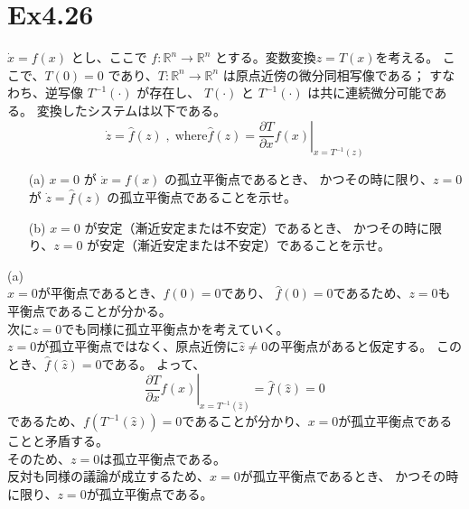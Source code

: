 \documentclass{jsarticle}
\begin{document}
\newpage
\section*{Ex4.26}

$\dot x = f ( x )$ とし、ここで $f \colon \mathbb R^n \rightarrow \mathbb R^n$
とする。変数変換$z = T(x)$を考える。
ここで、$T ( 0 ) = 0$ であり、$T \colon \mathbb R^n → \mathbb R^n$ 
は原点近傍の微分同相写像である；
すなわち、逆写像 $T^{ - 1} ( \cdot)$ が存在し、
$T ( \cdot )$ と $T ^{- 1} ( \cdot )$ 
は共に連続微分可能である。
変換したシステムは以下である。
\begin{equation*}
  \dot z = \hat f(z) \;,\; \text{where} \hat f(z) = \left.\frac{\partial T}{\partial x}f(x)\right|_{x = T^{-1}(z)}
\end{equation*}

\begin{itemize}
  \item[(a)] $x = 0$ が $\dot x = f ( x )$ の孤立平衡点であるとき、
  かつその時に限り、$z = 0$ が $\dot z = \hat f ( z )$ の孤立平衡点であることを示せ。
  \item[(b)] $x = 0$ が安定（漸近安定または不安定）であるとき、
  かつその時に限り、$z = 0$ が安定（漸近安定または不安定）であることを示せ。
\end{itemize}
{\color{gray}\hrulefill}

(a)\\
$x=0$が平衡点であるとき、$f(0)=0$であり、
$\hat f(0)=0$であるため、$z=0$も平衡点であることが分かる。\\
次に$z=0$でも同様に孤立平衡点かを考えていく。\\
$z=0$が孤立平衡点ではなく、原点近傍に$\hat z \neq 0$の平衡点があると仮定する。
このとき、$\hat f(\hat z) = 0$である。
よって、
\begin{equation*}
  \left.\frac{\partial T}{\partial x}f(x)\right|_{x = T^{-1}(\hat z)} = \hat f(\hat z) = 0
\end{equation*}
であるため、$f( T^{-1}(\hat z)) = 0$であることが分かり、$x=0$が孤立平衡点である
ことと矛盾する。\\
そのため、$z=0$は孤立平衡点である。\\
反対も同様の議論が成立するため、$x=0$が孤立平衡点であるとき、
かつその時に限り、$z=0$が孤立平衡点である。
\end{document}
